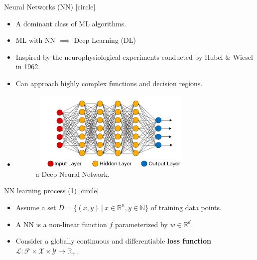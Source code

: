 \begin{frame}{Neural Networks (NN)}
    [circle]
    \begin{itemize}
        \item{A dominant class of ML algorithms.}
        \vspace{0.2cm}
        \item{ML with NN $\implies$ Deep Learning (DL)}
        \vspace{0.2cm}
        \item{Inspired by the neurophysiological experiments conducted by Hubel \& Wiesel in 1962.}
        \vspace{0.2cm}
        \item{Can approach highly complex functions and decision regions.}
        \vspace{0.2cm}
        \item[]{
        \begin{figure}[H]
            \centering
            \includegraphics[width=8cm,height=3.8cm]{images/dnn.png}
            \caption{a Deep Neural Network.}
            \label{fig:dnn}
        \end{figure}}
    \end{itemize}
\end{frame}

\begin{frame}{NN learning process (1)}
    [circle]
    \begin{itemize}
        \item{Assume a set $D=\{(x,y)\:|\:x\in\mathbb{R}^n,y\in\mathbb{N}\}$ of training data points.}
        \vspace{1cm}
        \item{A NN is a non-linear function $f$ parameterized by $w\in\mathbb{R}^d$.}
        \vspace{1cm}
        \item{Consider a globally continuous and differentiable \textbf{loss function} $\mathcal{L}:\mathcal{F}\times\mathcal{X}\times\mathcal{Y}\rightarrow\mathbb{R}_+$.}
    \end{itemize}
\end{frame}

